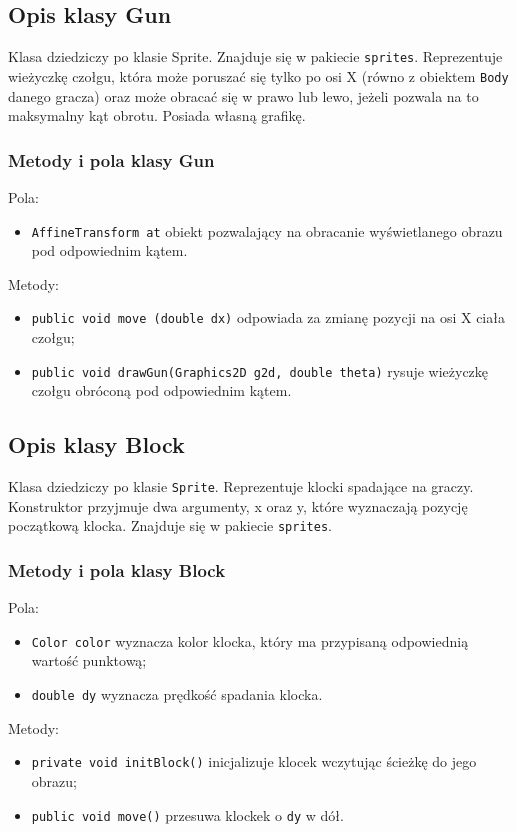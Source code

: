 \documentclass[12pt]{report}
\newcommand{\code}[1]{\texttt{#1}}
\begin{document}
\subsection{Opis klasy Gun}
Klasa dziedziczy po klasie Sprite. Znajduje się w pakiecie \code{sprites}. Reprezentuje wieżyczkę czołgu, która może poruszać się tylko po osi X (równo z obiektem \code{Body} danego gracza) oraz może obracać się w prawo lub lewo, jeżeli pozwala na to maksymalny kąt obrotu. Posiada własną grafikę.
\subsubsection{Metody i pola klasy Gun}
Pola:
\begin{itemize}
    \item \code{AffineTransform at} obiekt pozwalający na obracanie wyświetlanego obrazu pod odpowiednim kątem.
\end{itemize}
Metody:
\begin{itemize}
    \item \code{public void move (double dx)} odpowiada za zmianę pozycji na osi X ciała czołgu;
    \item \code{public void drawGun(Graphics2D g2d, double theta)} rysuje wieżyczkę czołgu obróconą pod odpowiednim kątem.
\end{itemize}



\subsection{Opis klasy Block}
Klasa dziedziczy po klasie \code{Sprite}. Reprezentuje klocki spadające na graczy. Konstruktor przyjmuje dwa argumenty, x oraz y, które wyznaczają pozycję początkową klocka. Znajduje się w pakiecie \code{sprites}.
\subsubsection{Metody i pola klasy Block}
Pola:
\begin{itemize}
    \item \code{Color color} wyznacza kolor klocka, który ma przypisaną odpowiednią wartość punktową;
    \item \code{double dy} wyznacza prędkość spadania klocka. 
\end{itemize}
Metody:
\begin{itemize}
    \item \code{private void initBlock()} inicjalizuje klocek wczytując ścieżkę do jego obrazu;
    \item \code{public void move()} przesuwa klockek o \code{dy} w dół.
\end{itemize}
\end{document}
